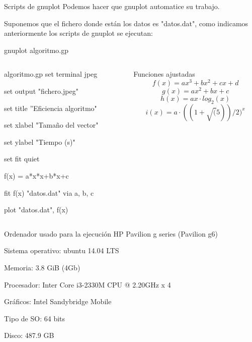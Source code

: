 \documentclass[compress]{beamer}
\begin{document}
\begin{frame}
	\begin{block}{Scripts de gnuplot}
		Podemos hacer que gnuplot automatice su trabajo.
		
		Suponemos que el fichero donde están los datos es "datos.dat", como indicamos anteriormente los scripts de gnuplot se ejecutan:
		
		\hspace{2cm} gnuplot algoritmo.gp
	\end{block}
	\pause
	
	\begin{columns}
	\begin{column}{5cm}
	\begin{exampleblock}{algoritmo.gp}
	set terminal jpeg
	
	set output "fichero.jpeg"
	
	set title ''Eficiencia algoritmo"
	
	set xlabel "Tamaño del vector"

	set ylabel "Tiempo (s)"

	set fit quiet

	f(x) = a*x*x+b*x+c

	fit f(x) "datos.dat" via a, b, c

	plot "datos.dat", f(x)
	\end{exampleblock}
	\end{column}
	\pause
	
	\begin{column}{5cm}
	\begin{block}{Funciones ajustadas}
		\[f(x)=ax^3 + bx^2 + cx + d\]
		\[g(x)=ax^2 + bx + c\]
		\[h(x)=ax\cdot log_2(x)\]
		\[i(x)=a \cdot ((1+ \sqrt(5))/2)^x\]
	\end{block}
	\end{column}
	
	\end{columns}
\end{frame}

\begin{frame}
	\begin{alertblock}{Ordenador usado para la ejecuci\'on}
	HP Pavilion g series (Pavilion g6)

	Sistema operativo: ubuntu 14.04 LTS

	Memoria: 3.8 GiB (4Gb)

	Procesador: Inter Core i3-2330M CPU @ 2.20GHz x 4

	Gráficos: Intel Sandybridge Mobile

	Tipo de SO: 64 bits

	Disco: 487.9 GB	
	\end{alertblock}
\end{frame}
\end{document}
